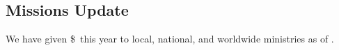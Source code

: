 \subsection{Missions Update}
\label{missionsupdate}

 We have given \$\missions \ this year to local, national, and worldwide ministries as of \givingupdatedate.


